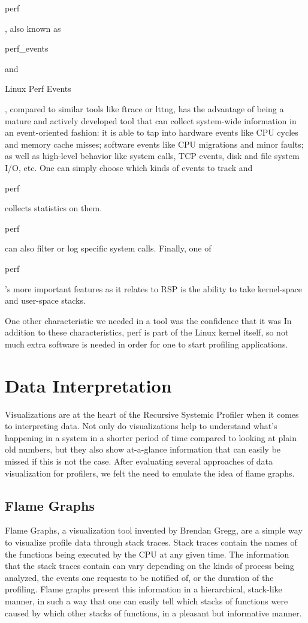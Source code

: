 \documentclass{article}
\begin{document}
\begin{tt}perf\end{tt}, also known as \begin{tt}perf\_events\end{tt} and \begin{tt}Linux Perf Events\end{tt}, compared to similar tools like ftrace or lttng, has the advantage of being a mature and actively developed tool that can collect system-wide information in an event-oriented fashion: it is able to tap into hardware events like CPU cycles and memory cache misses; software events like CPU migrations and minor faults; as well as high-level behavior like system calls, TCP events, disk and file system I/O, etc. One can simply choose which kinds of events to track and \begin{tt}perf\end{tt} collects statistics on them. \begin{tt}perf\end{tt} can also filter or log specific system calls. Finally, one of \begin{tt}perf\end{tt}'s more important features as it relates to RSP is the ability to take kernel-space and user-space stacks.

One other characteristic we needed in a tool was the confidence that it was  In addition to these characteristics, perf is part of the Linux kernel itself, so not much extra software is needed in order for one to start profiling applications.

\section{Data Interpretation}
Visualizations are at the heart of the Recursive Systemic Profiler when it comes to interpreting data. Not only do visualizations help to understand what's happening in a system in a shorter period of time compared to looking at plain old numbers, but they also show at-a-glance information that can easily be missed if this is not the case. After evaluating several approaches of data visualization for profilers, we felt the need to emulate the idea of flame graphs.

\subsection{Flame Graphs}
Flame Graphs, a visualization tool invented by Brendan Gregg, are a simple way to visualize profile data through stack traces. Stack traces contain the names of the functions being executed by the CPU at any given time. The information that the stack traces contain can vary depending on the kinds of process being analyzed, the events one requests to be notified of, or the duration of the profiling. Flame graphs present this information in a hierarchical, stack-like manner, in such a way that one can easily tell which stacks of functions were caused by which other stacks of functions, in a pleasant but informative manner.
\end{document}
